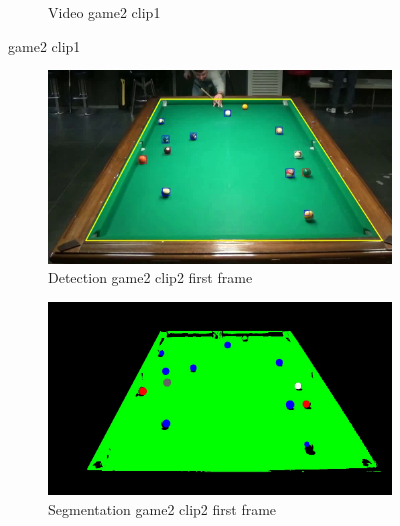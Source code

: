 \begin{figure}[H]
\begin{subfigure}[b]{0.48\textwidth}
    	\caption{Video game2 clip1}
    	\label{fig: game2_clip1_video}
    \end{subfigure}

	\caption{game2 clip1}
\end{figure}


\begin{figure}[H]
    \centering
    \begin{subfigure}[b]{0.48\textwidth}
        \centering
        \includegraphics[width=\textwidth]{images/Detection/game2_clip2_detected_balls_first_frame.jpg}
        \caption{Detection game2 clip2 first frame}
        \label{fig: game2_clip2_first_frame_detected}
    \end{subfigure}
    \begin{subfigure}[b]{0.48\textwidth}
        \centering
        \includegraphics[width=\textwidth]{images/Segmentation/game2_clip2_segmented_balls_first_frame.jpg}
        \caption{Segmentation game2 clip2 first frame}
		\label{fig: game2_clip2_first_frame_segmented}
    \end{subfigure}
    \begin{subfigure}[b]{0.48\textwidth}

\end{subfigure}
\end{figure}

